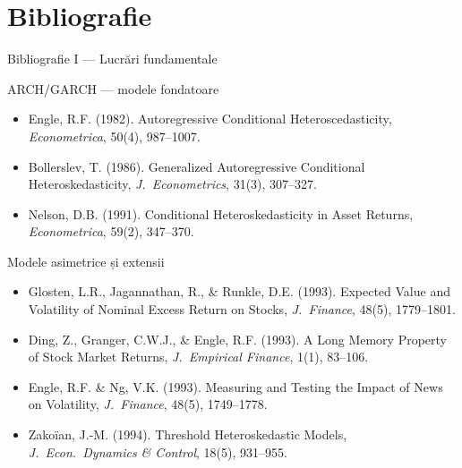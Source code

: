 \documentclass[9pt, aspectratio=169, t]{beamer}
\begin{document}
\section{Bibliografie}

\begin{frame}{Bibliografie I --- Lucrări fundamentale}
    \small
    \vspace{-0.4cm}
        \begin{block}{ARCH/GARCH --- modele fondatoare}
            \begin{itemize}\setlength{\itemsep}{-1pt}
                \item Engle, R.F. (1982). Autoregressive Conditional Heteroscedasticity, \textit{Econometrica}, 50(4), 987--1007.
                \item Bollerslev, T. (1986). Generalized Autoregressive Conditional Heteroskedasticity, \textit{J.\ Econometrics}, 31(3), 307--327.
                \item Nelson, D.B. (1991). Conditional Heteroskedasticity in Asset Returns, \textit{Econometrica}, 59(2), 347--370.
            \end{itemize}
        \end{block}
        \vspace{-0.15cm}
        \begin{exampleblock}{Modele asimetrice și extensii}
            \begin{itemize}\setlength{\itemsep}{-1pt}
                \item Glosten, L.R., Jagannathan, R., \& Runkle, D.E. (1993). Expected Value and Volatility of Nominal Excess Return on Stocks, \textit{J.\ Finance}, 48(5), 1779--1801.
                \item Ding, Z., Granger, C.W.J., \& Engle, R.F. (1993). A Long Memory Property of Stock Market Returns, \textit{J.\ Empirical Finance}, 1(1), 83--106.
                \item Engle, R.F. \& Ng, V.K. (1993). Measuring and Testing the Impact of News on Volatility, \textit{J.\ Finance}, 48(5), 1749--1778.
                \item Zakoïan, J.-M. (1994). Threshold Heteroskedastic Models, \textit{J.\ Econ.\ Dynamics \& Control}, 18(5), 931--955.
            \end{itemize}
        \end{exampleblock}
\end{frame}
\end{document}
